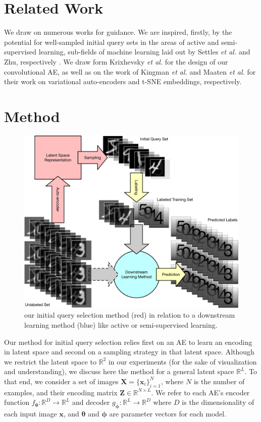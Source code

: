 \documentclass[a4paper]{article}
\def\vec#1{\ensuremath{\bm{{#1}}}}
\def\mat#1{\vec{#1}}
\begin{document}
\section{Related Work}
\label{sec:related-work}

We draw on numerous works for guidance. We are inspired, firstly, by the
potential for well-sampled initial query sets in the areas of active and
semi-supervised learning, sub-fields of machine learning laid out by Settles
\emph{et al.} and Zhu, respectively \cite{settles_active_2012,
  zhu_semi-supervised_2005}. We draw form Krixhevsky \emph{et al.} for the
design of our convolutional AE, as well as on the work of Kingman \emph{et al.}
and Maaten \emph{et al.} for their work on variational auto-encoders and t-SNE
embeddings, respectively.

\section{Method}
\label{sec:method}

\begin{figure}
  \centering
  \includegraphics[width=\linewidth]{docs/query_selection}
  \caption{our initial query selection method (red) in relation to a downstream
    learning method (blue) like active or semi-supervised learning.}
  \label{fig:overview}
\end{figure}

Our method for initial query selection relies first on an AE to learn an
encoding in latent space and second on a sampling strategy in that latent
space. Although we restrict the latent space to $\mathbb{R}^2$ in our
experiments (for the sake of visualization and understanding), we discuss here
the method for a general latent space $\mathbb{R}^L$. To that end, we consider a
set of images $\mat{X} = \{\vec{x}_i\}_{i=1}^N$, where $N$ is the number of
examples, and their encoding matrix $\mat{Z} \in \mathbb{R}^{N\times L}$. We
refer to each AE's encoder function
$f_{\vec{\theta}} : \mathbb{R}^D \rightarrow \mathbb{R}^L$ and decoder
$g_{\vec{\phi}} : \mathbb{R}^L \rightarrow \mathbb{R}^D$ where $D$ is the
dimensionality of each input image $\vec{x}$, and $\vec{\theta}$ and
$\vec{\phi}$ are parameter vectors for each model.
\end{document}
